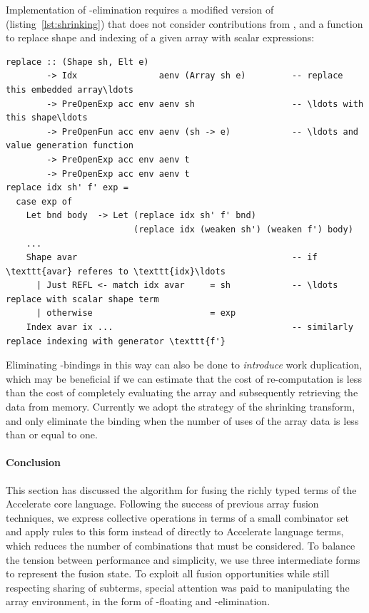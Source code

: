 Implementation of -elimination requires a modified version of
 (listing~\ref{lst:shrinking}) that does not consider
contributions from , and a function to replace shape and indexing
of a given array with scalar expressions:
%
\begin{lstlisting}[style=haskell]
replace :: (Shape sh, Elt e)
        -> Idx                aenv (Array sh e)         -- replace this embedded array\ldots
        -> PreOpenExp acc env aenv sh                   -- \ldots with this shape\ldots
        -> PreOpenFun acc env aenv (sh -> e)            -- \ldots and value generation function
        -> PreOpenExp acc env aenv t
        -> PreOpenExp acc env aenv t
replace idx sh' f' exp =
  case exp of
    Let bnd body  -> Let (replace idx sh' f' bnd)
                         (replace idx (weaken sh') (weaken f') body)
    ...
    Shape avar                                          -- if \texttt{avar} referes to \texttt{idx}\ldots
      | Just REFL <- match idx avar     = sh            -- \ldots replace with scalar shape term
      | otherwise                       = exp
    Index avar ix ...                                   -- similarly replace indexing with generator \texttt{f'}
\end{lstlisting}

Eliminating -bindings in this way can also be done to
\emph{introduce} work duplication, which may be beneficial if we can estimate
that the cost of re-computation is less than the cost of completely evaluating
the array and subsequently retrieving the data from memory. Currently we adopt
the strategy of the shrinking transform, and only eliminate the binding when the
number of uses of the array data is less than or equal to one.


\paragraph{Conclusion}

This section has discussed the algorithm for fusing the richly typed terms of
the Accelerate core language. Following the success of previous array fusion
techniques, we express collective operations in terms of a small combinator set
and apply rules to this form instead of directly to Accelerate language terms,
which reduces the number of combinations that must be considered. To balance the
tension between performance and simplicity, we use three intermediate forms to
represent the fusion state.
%
To exploit all fusion opportunities while still respecting sharing of subterms,
special attention was paid to manipulating the array environment, in the form of
-floating
and -elimination.


